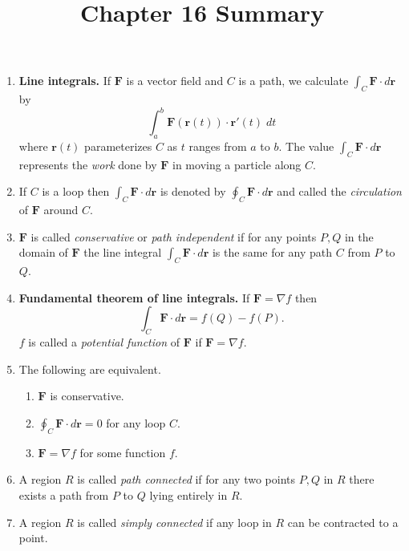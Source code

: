 \documentclass[12pt]{article}
\title{Chapter 16 Summary}
\author{}\date{}
\begin{document}
\maketitle
\thispagestyle{empty}

\begin{enumerate}
\item{\bf Line integrals.}
If $\mathbold{F}$ is a vector field and
$C$ is a path, we calculate $\int_C\mathbold{F}\cdot d\mathbold{r}$ by
\[\int_a^b\mathbold{F}\left(\mathbold{r}\left(t\right)\right)
\cdot\mathbold{r}'\left(t\right)\;dt\]
where $\mathbold{r}\left(t\right)$ parameterizes $C$
as $t$ ranges from $a$ to $b$.
The value $\int_C\mathbold{F}\cdot d\mathbold{r}$ represents
the {\em work} done by $\mathbold{F}$ in moving a particle along $C$.

\item If $C$ is a loop then
$\int_C\mathbold{F}\cdot d\mathbold{r}$
is denoted by
$\oint_C\mathbold{F}\cdot d\mathbold{r}$ and called the
{\em circulation} of $\mathbold{F}$ around $C$.

\item $\mathbold{F}$ is called {\em conservative} or {\em
path independent} if for any points $P,Q$ in the domain of $\mathbold{F}$
the line integral
$\int_C\mathbold{F}\cdot d\mathbold{r}$ is the same for any
path $C$ from $P$ to $Q$.

\item{\bf Fundamental theorem of line integrals.}
If $\mathbold{F}=\nabla f$ then
\[\int_C\mathbold{F}\cdot d\mathbold{r}=f\left(Q\right)-f\left(P\right).\]
$f$ is called a {\em potential function}
of $\mathbold{F}$ if $\mathbold{F}=\nabla f$.

\item The following are equivalent.
\begin{enumerate}
\item $\mathbold{F}$ is conservative.
\item $\oint_C\mathbold{F}\cdot d\mathbold{r}=0$
for any loop $C$.
\item $\mathbold{F}=\nabla f$ for some function $f$.
\end{enumerate}

\item A region $R$ is called {\em path connected}
if for any two points $P,Q$ in $R$ there exists
a path from $P$ to $Q$ lying entirely in $R$.

\item A region $R$ is called {\em simply connected}
if any loop in $R$ can be contracted to a point.


\end{enumerate}
\end{document}

